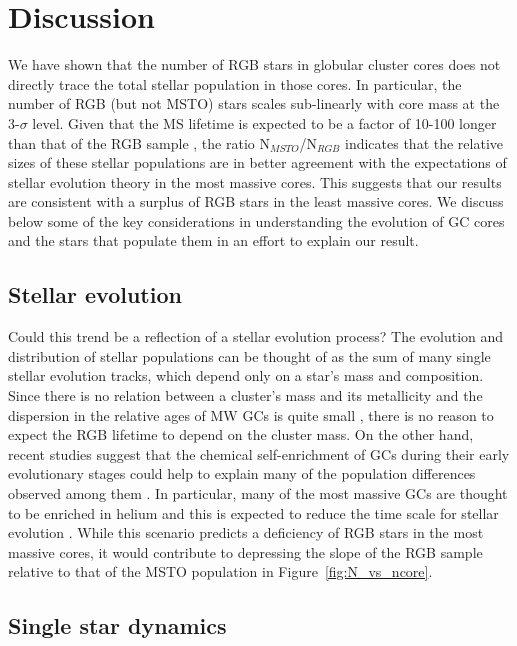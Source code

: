 \section{Discussion} \label{discussion3}

We have shown that the number of RGB stars in globular cluster cores
does not directly trace the total stellar population in those cores.  In
particular, the number of RGB (but not MSTO) stars 
scales sub-linearly with core mass at the 3-$\sigma$ level.  Given
that the MS lifetime is expected to be a factor of 10-100 
longer than that of the RGB sample \citep{iben91}, the ratio
N$_{MSTO}$/N$_{RGB}$ indicates that the relative sizes of these stellar
populations are in better agreement with the expectations of stellar evolution
theory in the most massive cores.  This suggests that our results are
consistent with a surplus of RGB stars in the least massive cores.  We 
discuss below some of the key considerations in understanding the
evolution of GC cores and the stars that populate them in an effort to
explain our result.

\subsection{Stellar evolution}

Could this trend be a reflection of a stellar evolution process?  The
evolution and distribution of stellar populations can be thought 
of as the sum of many single stellar evolution tracks, which depend
only on a star's mass and composition.  Since there is no relation
between a cluster's mass and its metallicity \citep{harris96} and the
dispersion in the relative ages of MW GCs is quite small
\citep{deangeli05}, there is no reason to expect the RGB 
lifetime to depend on the cluster mass.  On the other hand, recent
studies suggest that 
the chemical self-enrichment of GCs during their early evolutionary
stages could help to explain many of the population differences
observed among them \citep[e.g.][]{caloi07}.  In particular, many of
the most massive GCs are thought to be enriched in helium and this is
expected to reduce the time scale for stellar evolution
\citep[e.g.][]{romano07}.  While this scenario predicts a deficiency
of RGB stars in the most massive cores, it would contribute to
depressing the slope of the RGB sample relative to that of the MSTO
population in Figure~\ref{fig:N_vs_ncore}.  

\subsection{Single star dynamics} \label{dynamics3}

